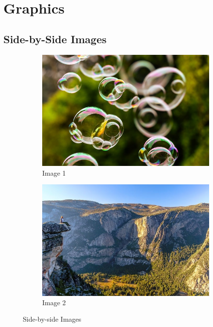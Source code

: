 \documentclass[12pt,a4paper]{report}
\begin{document}
\chapter{Graphics}
\section{Side-by-Side Images}
\begin{figure}[H]
\centering
\begin{subfigure}{0.45\textwidth}
    \includegraphics[width=\linewidth]{image1.jpg}
    \caption{Image 1}
\end{subfigure}
\hfill
\begin{subfigure}{0.45\textwidth}
    \includegraphics[width=\linewidth]{image2.jpg}
    \caption{Image 2}
\end{subfigure}
\caption{Side-by-side Images}
\end{figure}
\end{document}
